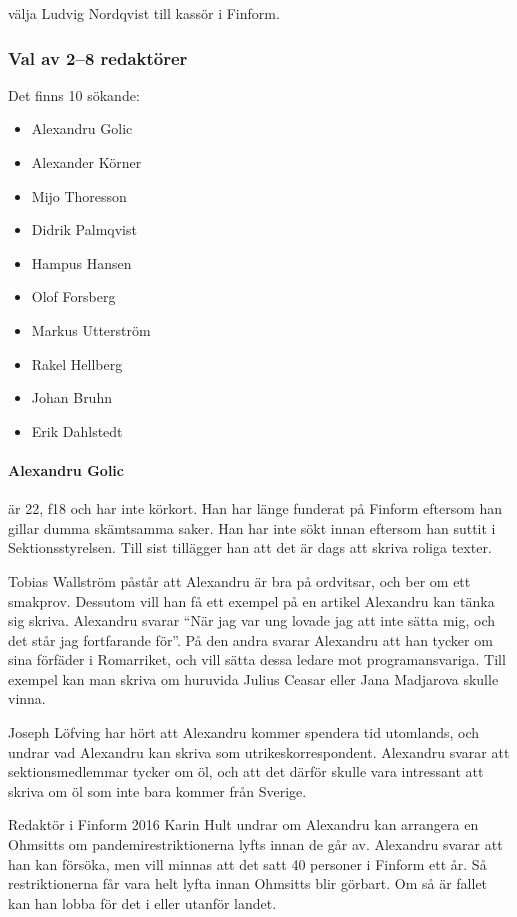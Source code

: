 \documentclass[hidelinks]{sektionsmote}
\begin{document}
\begin{beslut}
  \item välja Ludvig Nordqvist till kassör i Finform.
\end{beslut}


\subsubsection{Val av 2--8 redaktörer}
Det finns 10 sökande:
\begin{itemize}
    \item Alexandru Golic
    \item Alexander Körner
    \item Mijo Thoresson
    \item Didrik Palmqvist
    \item Hampus Hansen
    \item Olof Forsberg
    \item Markus Utterström
    \item Rakel Hellberg
    \item Johan Bruhn
    \item Erik Dahlstedt
\end{itemize}

\paragraph{Alexandru Golic} är 22, f18 och har inte körkort.
Han har länge funderat på Finform eftersom han gillar dumma skämtsamma saker.
Han har inte sökt innan eftersom han suttit i Sektionsstyrelsen.
Till sist tillägger han att det är dags att skriva roliga texter.

Tobias Wallström påstår att Alexandru är bra på ordvitsar, och ber om ett smakprov.
Dessutom vill han få ett exempel på en artikel Alexandru kan tänka sig skriva.
Alexandru svarar \enquote{När jag var ung lovade jag att inte sätta mig, och det står jag fortfarande för}.
På den andra svarar Alexandru att han tycker om sina förfäder i Romarriket, och vill sätta dessa ledare mot programansvariga.
Till exempel kan man skriva om huruvida Julius Ceasar eller Jana Madjarova skulle vinna.

Joseph Löfving har hört att Alexandru kommer spendera tid utomlands, och undrar vad Alexandru kan skriva som utrikeskorrespondent.
Alexandru svarar att sektionsmedlemmar tycker om öl, och att det därför skulle vara intressant att skriva om öl som inte bara kommer från  Sverige.

Redaktör i Finform 2016 Karin Hult undrar om Alexandru kan arrangera en Ohmsitts om pandemirestriktionerna lyfts innan de går av.
Alexandru svarar att han kan försöka, men vill minnas att det satt 40 personer i Finform ett år.
Så restriktionerna får vara helt lyfta innan Ohmsitts blir görbart.
Om så är fallet kan han lobba för det i eller utanför landet.
\end{document}
